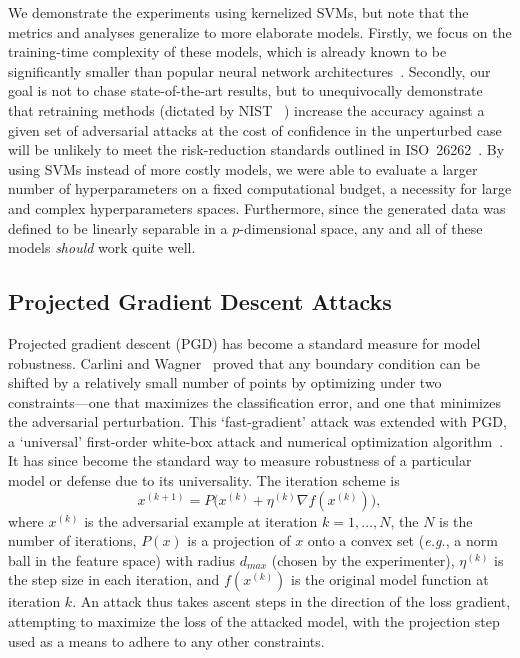 \documentclass[fonts]{icst}
\begin{document}
We demonstrate the experiments using kernelized SVMs, but note that the metrics and analyses generalize to more elaborate models.
Firstly, we focus on the training-time complexity of these models, which is already known to be significantly smaller than popular neural network architectures~\cite{bienstock2018principled}.
Secondly, our goal is not to chase state-of-the-art results, but to unequivocally demonstrate that retraining methods (dictated by NIST ~\cite{falco2006using}) increase the accuracy against a given set of adversarial attacks at the cost of confidence in the unperturbed case will be unlikely to meet the risk-reduction standards outlined in ISO~26262~\cite{iso26262}.
By using SVMs instead of more costly models, we were able to evaluate a larger number of hyperparameters on a fixed computational budget, a necessity for large and complex hyperparameters spaces.
Furthermore, since the generated data was defined to be linearly separable in a $p$-dimensional space, any and all of these models \textit{should} work quite well.

\subsection{Projected Gradient Descent Attacks}

Projected gradient descent (PGD) has become a standard measure for model robustness.
Carlini and Wagner~\cite{carlini2017towards} proved that any boundary condition can be shifted by a relatively small number of points by optimizing under two constraints---one that maximizes the classification error, and one that minimizes the adversarial perturbation.
This `fast-gradient' attack was extended with PGD, a `universal' first-order white-box attack and numerical optimization algorithm~\cite{madry2017towards}.
It has since become the standard way to measure robustness of a particular model or defense due to its universality.
The iteration scheme is
$$
    x^{(k+1)} = P\big(x^{(k)} + \eta^{(k)} \nabla f(x^{(k)})\big),
$$
where $x^{(k)}$ is the adversarial example at iteration $k = 1,\ldots,N$, the $N$ is the number of iterations, $P(x)$ is a projection of $x$ onto a convex set (\textit{e.g.}, a norm ball in the feature space) with radius $d_{max}$ (chosen by the experimenter), $\eta^{(k)}$ is the step size in each iteration, and $f(x^{(k)})$ is the original model function at iteration $k$.
An attack thus takes ascent steps in the direction of the loss gradient, attempting to maximize the loss of the attacked model, with the projection step used as a means to adhere to any other constraints.
\end{document}
